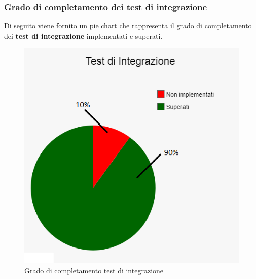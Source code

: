 	\subsubsection{Grado di completamento dei test di integrazione}
	Di seguito viene fornito un pie chart che rappresenta il grado di completamento dei \textbf{test di integrazione} implementati e superati.
	\begin{figure}[H]
		\centering
		\includegraphics[scale=0.7]{includes/img/test_integrazione.png}
		\caption{Grado di completamento test di integrazione}
	\end{figure}

	\clearpage
	
